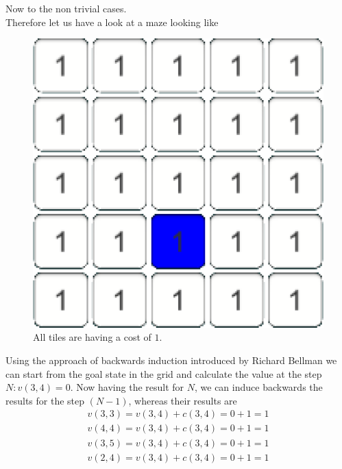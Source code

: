 \documentclass[conference]{IEEEtran}
\begin{document}
Now to the non trivial cases.\\
Therefore let us have a look at a maze looking like

\begin{figure}[H]
\centering
\begin{minipage}[t]{0.3\linewidth}
\centering
\includegraphics[width=1\textwidth]{images/ValueFunction/original.png}
\end{minipage}
\caption{All tiles are having a cost of
$1$.}
\end{figure}

Using the approach of backwards induction introduced by Richard Bellman we can start from the goal state in the grid and calculate the value at the step $N: v(3,4) = 0$.
Now having the result for $N$, we can induce backwards the results for the step $(N-1)$, whereas their results are
\begin{align}
v(3,3) = v(3,4) + c(3,4) = 0 + 1 = 1\\
v(4,4) = v(3,4) + c(3,4) = 0 + 1 = 1\\
v(3,5) = v(3,4) + c(3,4) = 0 + 1 = 1\\
v(2,4) = v(3,4) + c(3,4) = 0 + 1 = 1
\end{align}
\end{document}
